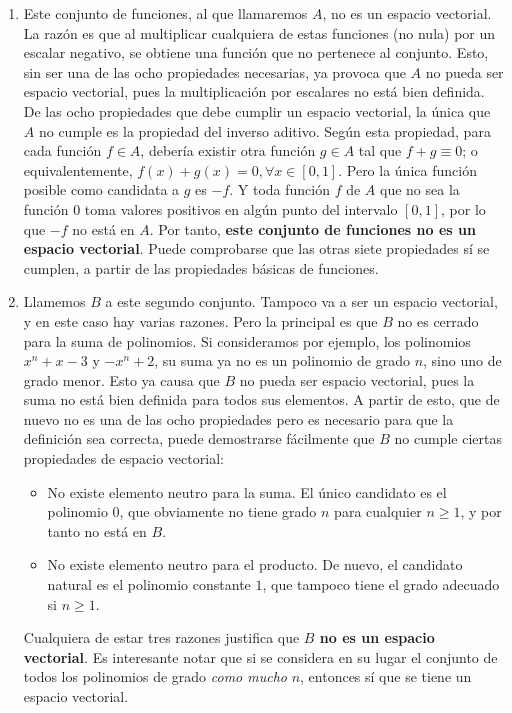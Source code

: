 \documentclass[12pt,a4paper]{report}
\begin{document}
\begin{enumerate}
 \item Este conjunto de funciones, al que llamaremos $A$, no es un espacio vectorial. La raz\'on es que al multiplicar cualquiera de estas funciones (no nula) por un escalar negativo, se obtiene una funci\'on que no pertenece al conjunto. Esto, sin ser una de las ocho propiedades necesarias, ya provoca que $A$ no pueda ser espacio vectorial, pues la multiplicaci\'on por escalares no est\'a bien definida. De las ocho propiedades que debe cumplir un espacio vectorial, la \'unica que $A$ no cumple es la propiedad del inverso aditivo. Seg\'un esta propiedad, para cada funci\'on $f\in A$, deber\'ia existir otra funci\'on $g\in A$ tal que $f+g \equiv 0$; o equivalentemente, $f(x)+g(x) = 0, \forall x\in[0,1]$. Pero la \'unica funci\'on posible como candidata a $g$ es $-f$. Y toda funci\'on $f$ de $A$ que no sea la funci\'on $0$ toma valores positivos en alg\'un punto del intervalo $[0,1]$, por lo que $-f$ no est\'a en $A$. Por tanto, {\bf este conjunto de funciones no es un espacio vectorial}. Puede comprobarse que las otras siete propiedades s\'i se cumplen, a partir de las propiedades b\'asicas de funciones.
 \item Llamemos $B$ a este segundo conjunto. Tampoco va a ser un espacio vectorial, y en este caso hay varias razones. Pero la principal es que $B$ no es cerrado para la suma de polinomios. Si consideramos por ejemplo, los polinomios $x^n + x - 3$ y $-x^n +2$, su suma ya no es un polinomio de grado $n$, sino uno de grado menor. Esto ya causa que $B$ no pueda ser espacio vectorial, pues la suma no est\'a bien definida para todos sus elementos. A partir de esto, que de nuevo no es una de las ocho propiedades pero es necesario para que la definici\'on sea correcta, puede demostrarse f\'acilmente que $B$ no cumple ciertas propiedades de espacio vectorial:
 \begin{itemize}
  \item No existe elemento neutro para la suma. El \'unico candidato es el polinomio $0$, que obviamente no tiene grado $n$ para cualquier $n\geq 1$, y por tanto no está en $B$.
  \item No existe elemento neutro para el producto. De nuevo, el candidato natural es el polinomio constante $1$, que tampoco tiene el grado adecuado si $n\geq 1$.
 \end{itemize}
 Cualquiera de estar tres razones justifica que {\bf $B$ no es un espacio vectorial}. Es interesante notar que si se considera en su lugar el conjunto de todos los polinomios de grado {\it como mucho} $n$, entonces s\'i que se tiene un espacio vectorial.
\end{enumerate}
\end{document}
